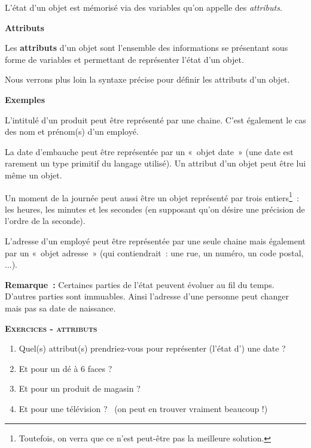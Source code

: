 L'état d'un objet est mémorisé via des
variables qu'on appelle des \textit{attributs}.

\bigskip

{\sffamily\bfseries\upshape
Attributs}

Les \textbf{attributs} d'un objet sont
l'ensemble des informations se présentant sous forme
de variables et permettant de représenter l'état
d'un objet.

Nous verrons plus loin la syntaxe précise pour définir les attributs
d'un objet.

{
\textbf{Exemples} }

\begin{liste}
	\item 
		L'intitulé d'un produit peut être
		représenté par une chaine. C'est également le cas des
		nom et prénom(s) d'un employé.
	\item 
		La date d'embauche peut être représentée par un «~objet
		date~» (une date est rarement un type primitif du langage utilisé). Un
		attribut d'un objet peut être lui même un objet.
	\item 
		Un moment de la journée peut aussi être un objet représenté par trois
		entiers\footnote{Toutefois, on verra que ce n'est
		peut-être pas la meilleure solution.}~: les heures, les minutes et les
		secondes (en supposant qu'on désire une précision de
		l'ordre de la seconde).
	\item 
		L'adresse d'un employé peut être
		représentée par une seule chaine mais également par un «~objet
		adresse~» (qui contiendrait~: une rue, un numéro, un code postal,
		...).
\end{liste}

{\textbf{Remarque}\textbf{~: }Certaines parties de
l'état peuvent évoluer au fil du temps.
D'autres parties sont immuables. Ainsi
l'adresse d'une personne peut changer
mais pas sa date de naissance. }

\clearpage
{}
{\sffamily\bfseries\scshape
Exercices - attributs}

\begin{enumerate}
	\item 
		Quel(s) attribut(s) prendriez-vous pour représenter
		(l'état d') une date ?
	\item 
		Et pour un dé à 6 faces ?
	\item 
		Et pour un produit de magasin ?
	\item 
		Et pour une télévision ? \ (on peut en trouver vraiment beaucoup !)
\end{enumerate}

